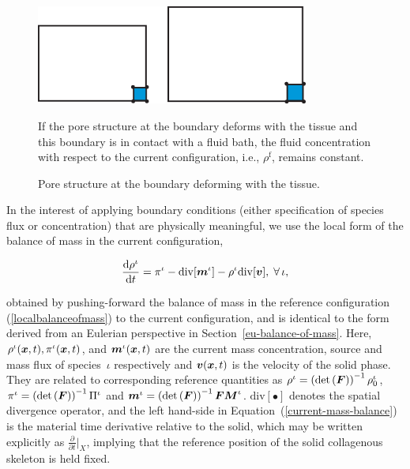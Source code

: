 \begin{figure}
  \begin{center}
    \includegraphics[width=0.8\textwidth]{images/elucidation/concentration}
    \caption{Pore structure at the boundary deforming with the tissue.} 
    \label{current-conc-fluid-bc}
  \end{center}
      {If the pore structure at the boundary deforms with the tissue and this
        boundary is in contact with a fluid bath, the fluid concentration
        with respect to the current configuration, i.e., $\rho^\mathrm{f}$,
        remains constant.}
\end{figure}

In the interest of applying boundary conditions (either specification
of species flux or concentration) that are physically meaningful, we
use the local form of the balance of mass in the current
configuration,

\begin{equation}
\frac{\mathrm{d}\rho^\iota}{\mathrm{d}t} = \pi^\iota-
\mathrm{div}[\mbox{\boldmath$ m$}^\iota] - \rho^\iota
\mathrm{div}[\mbox{\boldmath$ v$}],\;\forall\,\iota, \label{current-mass-balance}
\end{equation}

\noindent obtained by pushing-forward the balance of mass in the
reference configuration (\ref{localbalanceofmass}) to the current
configuration, and is identical to the form derived from an Eulerian
perspective in Section~\ref{eu-balance-of-mass}. Here,
$\rho^\iota(\mbox{\boldmath$ x$},t),\pi^\iota(\mbox{\boldmath$ x$},t)$, and $\mbox{\boldmath$ m$}^\iota(\mbox{\boldmath$ x$},t)$ are the
current mass concentration, source and mass flux of species~$\iota$
respectively and $\mbox{\boldmath$ v$}(\mbox{\boldmath$ x$},t)$ is the velocity of the solid phase. They
are related to corresponding reference quantities as \mbox{$\rho^\iota
  = \left(\mathrm{det} \left(\mbox{\boldmath$ F$}\right) \right)^{-1} \rho_0^\iota$},
\mbox{$\pi^\iota = \left(\mathrm{det} \left(\mbox{\boldmath$ F$}\right) \right)^{-1}
  \Pi^\iota$} and \mbox{$\mbox{\boldmath$ m$}^\iota = \left(\mathrm{det}
  \left(\mbox{\boldmath$ F$}\right) \right)^{-1} \mbox{\boldmath$ F$}
  \mbox{\boldmath$ M$}^\iota$}. $\mathrm{div}[\bullet]$ denotes the spatial divergence
operator, and the left hand-side in
Equation~(\ref{current-mass-balance}) is the material time derivative
relative to the solid, which may be written explicitly as
$\frac{\partial}{\partial t}\vert_X$, implying that the reference
position of the solid collagenous skeleton is held fixed.

